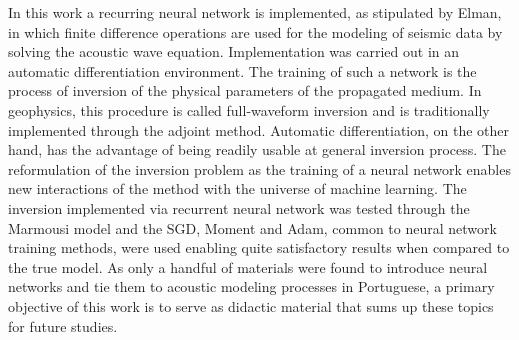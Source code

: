  
In this work a recurring neural network is implemented, as stipulated by Elman, in which finite difference operations are used for the modeling of seismic data by solving the acoustic wave equation. Implementation was carried out in an automatic differentiation environment. The training of such a network is the process of inversion of the physical parameters of the propagated medium. In geophysics, this procedure is called full-waveform inversion and is traditionally implemented through the adjoint method. Automatic differentiation, on the other hand, has the advantage of being readily usable at general inversion process. The reformulation of the inversion problem as the training of a neural network enables new interactions of the method with the universe of machine learning. The inversion implemented via recurrent neural network was tested through the Marmousi model and the SGD, Moment and Adam, common to neural network training  methods, were used enabling quite satisfactory results when compared to the true model. As only a handful of materials were found to introduce neural networks and tie them to acoustic modeling processes in Portuguese, a primary objective of this work is to serve as didactic material that sums up these topics for future studies.


% 
% 
% 
